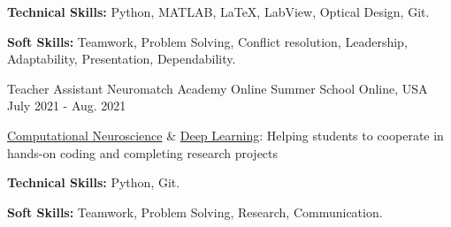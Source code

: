 \begin{cventries}
{\begin{cvitems}
\begin{itemize}
        \end{itemize}
          \item {\textbf{Technical Skills:} Python, MATLAB, \LaTeX, LabView, Optical Design, Git.}
        \item {\textbf{Soft Skills:} Teamwork, Problem Solving, Conflict resolution, Leadership, Adaptability, Presentation, Dependability.}
      \end{cvitems}
    }
  \cventry
    {Teacher Assistant}
    {Neuromatch Academy Online Summer School}
    {Online, USA}
    {July 2021 -  Aug. 2021}
    {
      \begin{cvitems} %
        \item{\href{https://github.com/NeuromatchAcademy/course-content-dl}{Computational Neuroscience} \& \href{https://github.com/NeuromatchAcademy/course-content-dl}{Deep Learning}: Helping students to cooperate in hands-on coding and completing research projects}
        \item {\textbf{Technical Skills:} Python, Git.}
        \item {\textbf{Soft Skills:} Teamwork, Problem Solving, Research, Communication.}
      \end{cvitems}
    }
 

\end{cventries}
